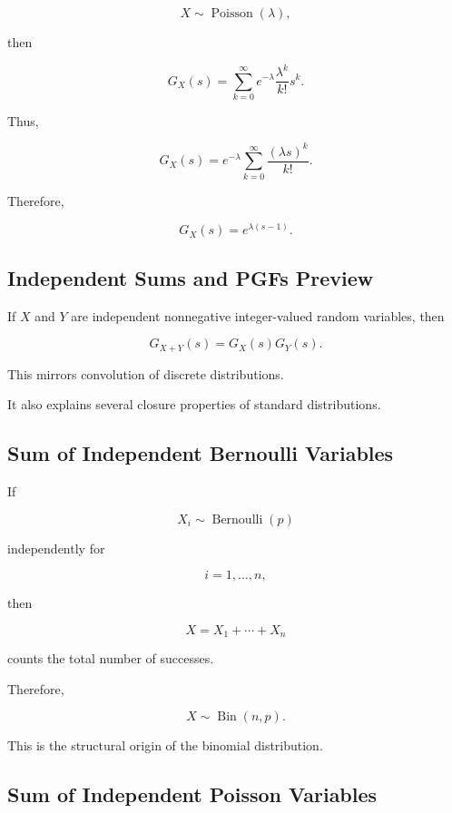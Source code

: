\[
X\sim\operatorname{Poisson}(\lambda),
\]

then

\[
G_X(s)
=
\sum_{k=0}^{\infty}
e^{-\lambda}
\frac{\lambda^k}{k!}
s^k.
\]

Thus,

\[
G_X(s)
=
e^{-\lambda}
\sum_{k=0}^{\infty}
\frac{(\lambda s)^k}{k!}.
\]

Therefore,

\[
\boxed{
G_X(s)
=
e^{\lambda(s-1)}.
}
\]

\subsection{Independent Sums and PGFs Preview}
\label{subsec:independent-sums-pgf-preview}

If \(X\) and \(Y\) are independent nonnegative integer-valued random
variables, then

\[
\boxed{
G_{X+Y}(s)
=
G_X(s)G_Y(s).
}
\]

This mirrors convolution of discrete distributions.

It also explains several closure properties of standard distributions.

\subsection{Sum of Independent Bernoulli Variables}
\label{subsec:sum-independent-bernoulli}

If

\[
X_i\sim\operatorname{Bernoulli}(p)
\]

independently for

\[
i=1,\ldots,n,
\]

then

\[
X
=
X_1+\cdots+X_n
\]

counts the total number of successes.

Therefore,

\[
\boxed{
X\sim\operatorname{Bin}(n,p).
}
\]

This is the structural origin of the binomial distribution.

\subsection{Sum of Independent Poisson Variables}
\label{subsec:sum-independent-poisson}

